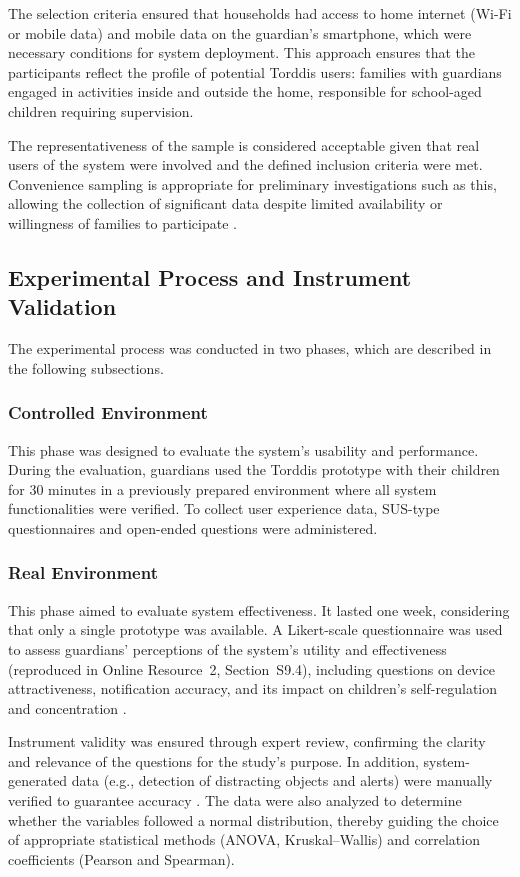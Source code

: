 The selection criteria ensured that households had access to home internet (Wi-Fi or mobile data) and mobile data on the guardian’s smartphone, which were necessary conditions for system deployment. This approach ensures that the participants reflect the profile of potential Torddis users: families with guardians engaged in activities inside and outside the home, responsible for school-aged children requiring supervision.

The representativeness of the sample is considered acceptable given that real users of the system were involved and the defined inclusion criteria were met. Convenience sampling is appropriate for preliminary investigations such as this, allowing the collection of significant data despite limited availability or willingness of families to participate \citep{DiPietro2025Meta}.

\subsection{Experimental Process and Instrument Validation}
The experimental process was conducted in two phases, which are described in the following subsections.

\subsubsection{Controlled Environment}
This phase was designed to evaluate the system’s usability and performance. During the evaluation, guardians used the Torddis prototype with their children for 30 minutes in a previously prepared environment where all system functionalities were verified. To collect user experience data, SUS-type questionnaires and open-ended questions were administered.

\subsubsection{Real Environment}
This phase aimed to evaluate system effectiveness. It lasted one week, considering that only a single prototype was available. A Likert-scale questionnaire was used to assess guardians' perceptions of the system’s utility and effectiveness (reproduced in Online Resource~2, Section~S9.4), including questions on device attractiveness, notification accuracy, and its impact on children's self-regulation and concentration \citep{Ackermans2025Young}.

Instrument validity was ensured through expert review, confirming the clarity and relevance of the questions for the study’s purpose. In addition, system-generated data (e.g., detection of distracting objects and alerts) were manually verified to guarantee accuracy \citep{Wang2025Development}. The data were also analyzed to determine whether the variables followed a normal distribution, thereby guiding the choice of appropriate statistical methods (ANOVA, Kruskal–Wallis) and correlation coefficients (Pearson and Spearman).

